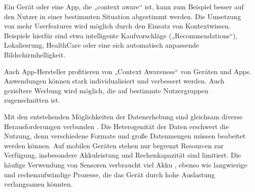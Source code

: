 Ein Gerät oder eine App, die „context aware“ ist, kann zum Beispiel besser auf den Nutzer in einer bestimmten Situation abgestimmt werden. Die Umsetzung von mehr Userfeatures wird möglich durch den Einsatz von Kontextwissen. Beispiele hierfür sind etwa intelligente Kaufvorschläge („Recommendations“), Lokaliesrung, HealthCare oder eine sich automatisch anpassende Bildschirmhelligkeit.

Auch App-Hersteller profitieren von „Context Awareness“ von Geräten und Apps. Anwendungen können stark individualisiert und verbessert werden. Auch gezieltere Werbung wird möglich, die auf bestimmte Nutzergruppen zugenschnitten ist.

Mit den entstehenden Möglichkeiten der Datenerhebung sind gleichsam diverse Herausforderungen verbunden \cite{context2015, orsini2016}. Die Heterogenität der Daten erschwert die Nutzung, denn verschiedene Formate und große Datenmengen müssen beabeitet werden können. Auf mobilen Geräten stehen nur begrenzt Resourcen zur Verfügung, insbesondere Akkuleistung und Rechenkapazität sind limitiert. Die häufige Verwendung von Sensoren verbraucht viel Akku \cite{context2015}, ebenso wie langwierige und rechenaufwändige Prozesse, die das Gerät durch hohe Auslastung verlangsamen könnten.